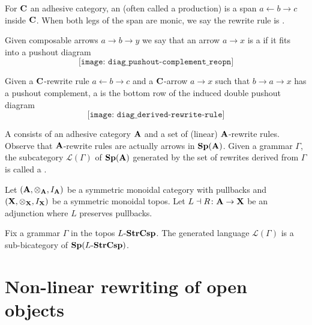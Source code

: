 \documentclass{amsart}
\begin{document}
\begin{df} \label{df_rewrite-rule}
	For $ \mathbf{C} $ an adhesive category, an  (often called a production) is a span $ a \gets b \to c $ inside $ \mathbf{C} $.  When both legs of the span are monic, we say the rewrite rule is .
\end{df}	
	
\begin{df} \label{df_pushout-complement}
	Given composable arrows $ a \to b \to y $ we say that an arrow $ a \to x $ is a  if it fits into a pushout diagram
	\[
	\texttt{[image: diag\_pushout-complement\_reopn]}
	\]
\end{df}

\begin{df} \label{df_derived-rewrite-rule}
	Given a $ \mathbf{C} $-rewrite rule $ a \gets b \to c $ and a $ \mathbf{C} $-arrow $a \to x$ such that $ b \to a \to x $ has a pushout complement, a  is the bottom row of the induced double pushout diagram
	\[
	\texttt{[image: diag\_derived-rewrite-rule]}
	\]
\end{df}

\begin{df} \label{df_grammar-and-language}
	A  consists of an adhesive category $ \mathbf{A} $ and a set of (linear) $ \mathbf{A} $-rewrite rules.  Observe that $ \mathbf{A} $-rewrite rules are actually arrows in $ \mathbf{Sp}(\mathbf{A}) $.  Given a grammar $ \Gamma $, the subcategory $ \mathcal{L} ( \Gamma ) $ of $ \mathbf{Sp}( \mathbf{A} ) $ generated by the set of rewrites derived from $ \Gamma $ is called a .  
\end{df}

\begin{lem} \label{thm_open-objects-language}
	Let $ (\mathbf{A} , \otimes_{\mathbf{A}} , I_{\mathbf{A}}) $ be a symmetric monoidal category with pullbacks and $ (\mathbf{X} , \otimes_{\mathbf{X}} , I_{\mathbf{X}}) $ be a symmetric monoidal topos.  Let $ L \dashv R \colon \mathbf{A} \to \mathbf{X} $ be an adjunction where $ L $ preserves pullbacks.
	
	Fix a grammar $ \Gamma $ in the topos $ L \text{-} \mathbf{StrCsp} $.  The generated  language $ \mathcal{L}(\Gamma) $ is a sub-bicategory of $ \mathbf{Sp}(L \text{-} \mathbf{StrCsp}) $. 
\end{lem}

\section{Non-linear rewriting of open objects}
\end{document}
